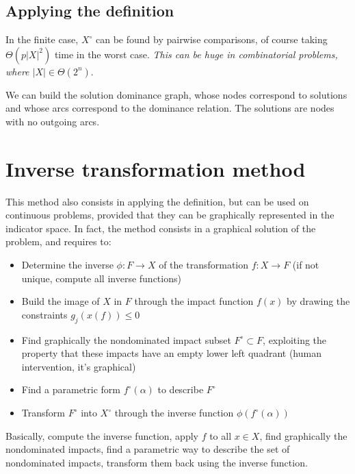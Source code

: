 \subsection{Applying the definition}
\label{subsec:applyingdefinition}

In the finite case, $X^\circ$ can be found by pairwise comparisons, of course taking $\Theta\left(p|X|^2\right)$ time in the worst case. \textit{This can be huge in combinatorial problems, where $|X| \in \Theta\left(2^n\right)$}.

We can build the solution dominance graph, whose nodes correspond to solutions and whose arcs correspond to the dominance relation. The solutions are nodes with no outgoing arcs.

\section{Inverse transformation method}
\label{sec:invtransformation}

This method also consists in applying the definition, but can be used on continuous problems, provided that they can be graphically represented in the indicator space. In fact, the method consists in a graphical solution of the problem, and requires to:
\begin{itemize}
	\item Determine the inverse $\phi: F \rightarrow X$ of the transformation $f: X \rightarrow F$ (if not unique, compute all inverse functions)
	
	\item Build the image of $X$ in $F$ through the impact function $f(x)$ by drawing the constraints $g_j (x(f)) \leq 0$
	
	\item Find graphically the nondominated impact subset $F^\circ \subset F$, exploiting the property that these impacts have an empty lower left quadrant (human intervention, it's graphical)
	
	\item Find a parametric form $f^\circ (\alpha)$ to describe $F^\circ$
	
	\item Transform $F^\circ$ into $X^\circ$ through the inverse function $\phi(f^\circ(\alpha))$
\end{itemize}

Basically, compute the inverse function, apply $f$ to all $x \in X$, find graphically the nondominated impacts, find a parametric way to describe the set of nondominated impacts, transform them back using the inverse function.

